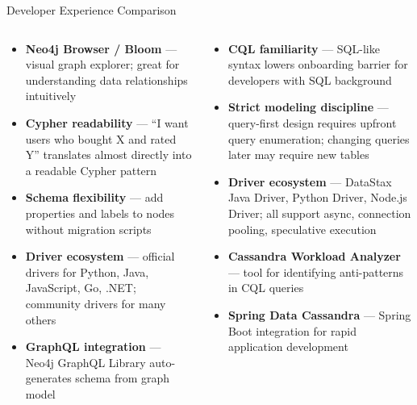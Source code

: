 \documentclass[aspectratio=169]{beamer}
\begin{document}
\begin{frame}{Developer Experience Comparison}
  \begin{columns}[T]
      \begin{tcolorbox}[neo4jbox, title=Neo4j Developer Experience]
        \small
        \begin{itemize}
          \item \textbf{Neo4j Browser / Bloom} — visual graph explorer; great for understanding data relationships intuitively
          \item \textbf{Cypher readability} — ``I want users who bought X and rated Y'' translates almost directly into a readable Cypher pattern
          \item \textbf{Schema flexibility} — add properties and labels to nodes without migration scripts
          \item \textbf{Driver ecosystem} — official drivers for Python, Java, JavaScript, Go, .NET; community drivers for many others
          \item \textbf{GraphQL integration} — Neo4j GraphQL Library auto-generates schema from graph model
        \end{itemize}
      \end{tcolorbox}
      \begin{tcolorbox}[cassbox, title=Cassandra Developer Experience]
        \small
        \begin{itemize}
          \item \textbf{CQL familiarity} — SQL-like syntax lowers onboarding barrier for developers with SQL background
          \item \textbf{Strict modeling discipline} — query-first design requires upfront query enumeration; changing queries later may require new tables
          \item \textbf{Driver ecosystem} — DataStax Java Driver, Python Driver, Node.js Driver; all support async, connection pooling, speculative execution
          \item \textbf{Cassandra Workload Analyzer} — tool for identifying anti-patterns in CQL queries
          \item \textbf{Spring Data Cassandra} — Spring Boot integration for rapid application development
        \end{itemize}
      \end{tcolorbox}
  \end{columns}
\end{frame}
\end{document}
